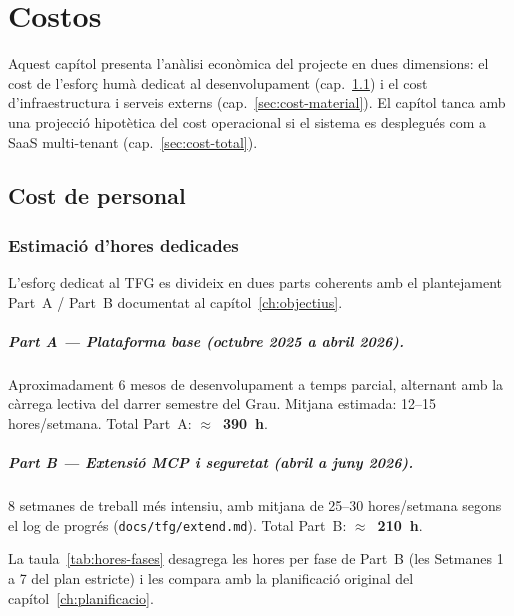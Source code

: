 \chapter{Costos}
\label{ch:costos}

Aquest capítol presenta l'anàlisi econòmica del projecte en dues dimensions: el cost de l'esforç humà dedicat al desenvolupament (cap.~\ref{sec:cost-personal}) i el cost d'infraestructura i serveis externs (cap.~\ref{sec:cost-material}). El capítol tanca amb una projecció hipotètica del cost operacional si el sistema es desplegués com a SaaS multi-tenant (cap.~\ref{sec:cost-total}).

\section{Cost de personal}
\label{sec:cost-personal}

\subsection{Estimació d'hores dedicades}

L'esforç dedicat al TFG es divideix en dues parts coherents amb el plantejament Part~A / Part~B documentat al capítol~\ref{ch:objectius}.

\paragraph{Part A — Plataforma base (octubre 2025 a abril 2026).} Aproximadament 6 mesos de desenvolupament a temps parcial, alternant amb la càrrega lectiva del darrer semestre del Grau. Mitjana estimada: 12--15 hores/setmana. Total Part~A: \textbf{$\approx$~390~h}.

\paragraph{Part B — Extensió MCP i seguretat (abril a juny 2026).} 8 setmanes de treball més intensiu, amb mitjana de 25--30 hores/setmana segons el log de progrés (\texttt{docs/tfg/extend.md}). Total Part~B: \textbf{$\approx$~210~h}.

La taula~\ref{tab:hores-fases} desagrega les hores per fase de Part~B (les Setmanes 1 a 7 del plan estricte) i les compara amb la planificació original del capítol~\ref{ch:planificacio}.

